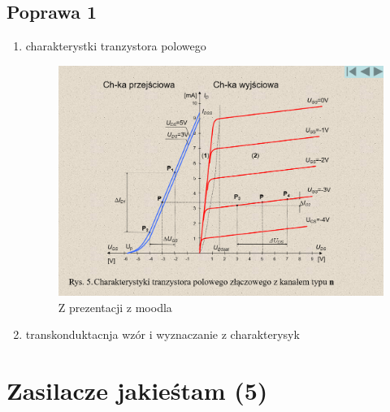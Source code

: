 \documentclass[11pt]{article}
\begin{document}
\subsection{Poprawa 1}
\label{sec:orgb11557d}
\begin{enumerate}
\item charakterystki tranzystora polowego
\label{sec:orgafac88c}
\begin{figure}[htbp]
\centering
\includegraphics[width=.9\linewidth]{img/tranzystorPolowy/charakterystykaN.png}
\caption{Z prezentacji z moodla}
\end{figure}
\item transkonduktacnja wzór i wyznaczanie z charakterysyk
\label{sec:orgbdd04d8}
\end{enumerate}
\section{Zasilacze jakieśtam (5)}
\label{sec:orgf8910c4}
\end{document}
